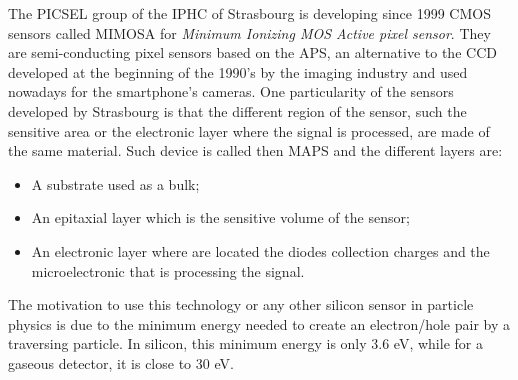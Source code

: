 
  The PICSEL group of the IPHC of Strasbourg is developing since 1999 CMOS sensors called MIMOSA for \textit{Minimum Ionizing MOS Active pixel sensor}. 
  They are semi-conducting pixel sensors based on the \gls{APS}, an alternative to the \gls{CCD} developed at the beginning of the 1990's by the imaging industry and used nowadays for the smartphone's cameras.
  One particularity of the sensors developed by Strasbourg is that the different region of the sensor, such the sensitive area or the electronic layer where the signal is processed, are made of the same material.
  Such device is called then \gls{MAPS} and the different layers are:
  \begin{itemize}
    \item A substrate used as a bulk;
    \item An epitaxial layer which is the sensitive volume of the sensor;
    \item An electronic layer where are located the diodes collection charges and the microelectronic that is processing the signal.
  \end{itemize}

  The motivation to use this technology or any other silicon sensor in particle physics is due to the minimum energy needed to create an electron/hole pair by a traversing particle.
  In silicon, this minimum energy is only 3.6 eV, while for a gaseous detector, it is close to 30 eV.

  
